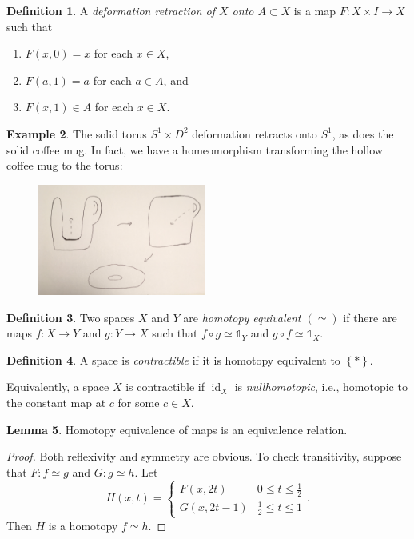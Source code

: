 \documentclass[10pt,letterpaper,cm]{nupset}
\theoremstyle{definition}
\newtheorem{definition}{Definition}[subsection]
\newtheorem{exmp}[definition]{Example}
\theoremstyle{theorem}
\newtheorem{lemma}[definition]{Lemma}
\theoremstyle{remark}
\newcommand{\1}{\mathbb{1}}
\newcommand{\0}{\vec 0}
\DeclareMathOperator{\id}{id}
\begin{document}
\begin{definition}
A \textit{deformation retraction of $X$ onto $A\subset X$} is a map $F: X \times I \to X$ such that 
\begin{enumerate}[label=(\roman*)]
\item $F(x, 0) = x$ for each $x\in X$, 
\item $F(a, 1) = a$ for each $a\in A$, and 
\item $F(x, 1) \in A$ for each $x\in X$.
\end{enumerate}
\end{definition}

\begin{exmp}
The solid torus $S^1 \times D^2$ deformation retracts onto $S^1$, as does the solid coffee mug. In fact, we have a homeomorphism transforming the hollow coffee mug to the torus:

\begin{figure}[H]
\centering
\includegraphics[width=55mm]{mug.jpg}
\end{figure}
\end{exmp}

\begin{definition}
Two spaces $X$ and $Y$ are \textit{homotopy equivalent $\left(\simeq\right)$} if there are maps $f: X\to Y$ and $g: Y \to X$ such that $f\circ g \simeq \mathbb{1}_Y$ and $g\circ f \simeq \mathbb{1}_X$.
\end{definition}

\begin{definition}
A space is \textit{contractible} if it is homotopy equivalent to $\left\{\ast \right\}$.
\end{definition}

Equivalently, a space $X$ is contractible if $\id_X$ is \textit{nullhomotopic}, i.e., homotopic to the constant map at $c$ for some $c\in X$.

\begin{lemma}
Homotopy equivalence of maps is an equivalence relation.
\end{lemma}
\begin{proof}
Both reflexivity and symmetry are obvious. To check transitivity, suppose that $F : f \simeq g$ and $G: g\simeq h$. Let $$H(x,t) = \begin{cases}
F(x, 2t) & 0 \leq t \leq \frac{1}{2}
\\ G(x, 2t-1) & \frac{1}{2} \leq t \leq 1
\end{cases}.$$ Then $H$ is a homotopy $f \simeq h$.
\end{proof}
\end{document}
